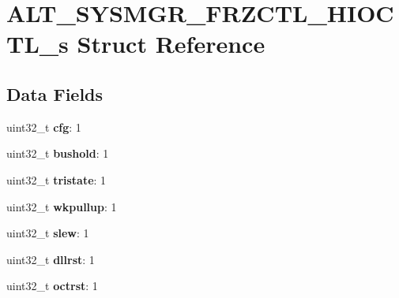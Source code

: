 \hypertarget{structALT__SYSMGR__FRZCTL__HIOCTL__s}{}\section{A\+L\+T\+\_\+\+S\+Y\+S\+M\+G\+R\+\_\+\+F\+R\+Z\+C\+T\+L\+\_\+\+H\+I\+O\+C\+T\+L\+\_\+s Struct Reference}
\label{structALT__SYSMGR__FRZCTL__HIOCTL__s}
\subsection*{Data Fields}
\begin{DoxyCompactItemize}
\item 
\mbox{\label{structALT__SYSMGR__FRZCTL__HIOCTL__s_aee9e6cddb627ff931eedfbf708c030f6}} 
uint32\+\_\+t {\bfseries cfg}\+: 1
\item 
\mbox{\label{structALT__SYSMGR__FRZCTL__HIOCTL__s_aad8fa1c301625d807489f07a6baf9613}} 
uint32\+\_\+t {\bfseries bushold}\+: 1
\item 
\mbox{\label{structALT__SYSMGR__FRZCTL__HIOCTL__s_ac8b16d2433a2f910c3d57c2bfe884917}} 
uint32\+\_\+t {\bfseries tristate}\+: 1
\item 
\mbox{\label{structALT__SYSMGR__FRZCTL__HIOCTL__s_aa3709aac98bde3ead86e045b42853bbd}} 
uint32\+\_\+t {\bfseries wkpullup}\+: 1
\item 
\mbox{\label{structALT__SYSMGR__FRZCTL__HIOCTL__s_a4f4fcb63dcc2bd8a06f13fe542364b5f}} 
uint32\+\_\+t {\bfseries slew}\+: 1
\item 
\mbox{\label{structALT__SYSMGR__FRZCTL__HIOCTL__s_a75dd35f8e1697a46d4cb05e03ac4d3ad}} 
uint32\+\_\+t {\bfseries dllrst}\+: 1
\item 
\mbox{\label{structALT__SYSMGR__FRZCTL__HIOCTL__s_aa7d2faff8aadcfe089f11951c2f5b7d1}} 
uint32\+\_\+t {\bfseries octrst}\+: 1
\item 
\mbox{\label{structALT__SYSMGR__FRZCTL__HIOCTL__s_ac4c8bd41d9ce2375ea3623e6f26a28fb}} 

\end{DoxyCompactItemize}
